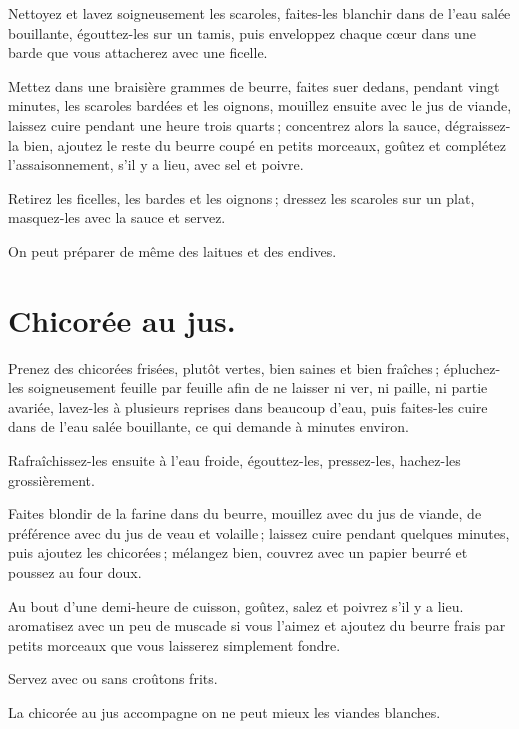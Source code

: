 Nettoyez et lavez soigneusement les scaroles, faites-les blanchir dans de l’eau
salée bouillante, égouttez-les sur un tamis, puis enveloppez chaque cœur dans
une barde que vous attacherez avec une ficelle.

Mettez dans une braisière {\mmm} grammes de beurre, faites suer dedans,
pendant vingt minutes, les scaroles bardées et les oignons, mouillez ensuite
avec le jus de viande, laissez cuire pendant une heure trois quarts ;
concentrez alors la sauce, dégraissez-la bien, ajoutez le reste du beurre coupé
en petits morceaux, goûtez et complétez l'assaisonnement, s'il y a lieu, avec
sel et poivre.

Retirez les ficelles, les bardes et les oignons ; dressez les scaroles sur un
plat, masquez-les avec la sauce et servez.

\sk

On peut préparer de même des laitues et des endives.

\section*{\centering Chicorée au jus.}
{}

Prenez des chicorées frisées, plutôt vertes, bien saines et bien fraîches ;
épluchez-les soigneusement feuille par feuille afin de ne laisser ni ver, ni
paille, ni partie avariée, lavez-les à plusieurs reprises dans beaucoup d'eau,
puis faites-les cuire dans de l’eau salée bouillante, ce qui demande
{\mmm} à {\mmm} minutes environ.

Rafraîchissez-les ensuite à l'eau froide, égouttez-les, pressez-les, hachez-les
grossièrement.

Faites blondir de la farine dans du beurre, mouillez avec du jus de viande, de
préférence avec du jus de veau et volaille ; laissez cuire pendant quelques
minutes, puis ajoutez les chicorées ; mélangez bien, couvrez avec un papier
beurré et poussez au four doux.

Au bout d'une demi-heure de cuisson, goûtez, salez et poivrez s'il y a lieu.
aromatisez avec un peu de muscade si vous l’aimez et ajoutez du beurre frais
par petits morceaux que vous laisserez simplement fondre.

Servez avec ou sans croûtons frits.

\medskip

La chicorée au jus accompagne on ne peut mieux les viandes blanches.

